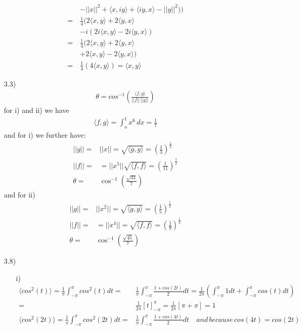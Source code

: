 \documentclass[letterpaper,12pt]{article}
\theoremstyle{definition}
\begin{document}
\begin{enumerate}
\begin{align*}
\quad & - ||x||^2 +\langle x, iy \rangle +\langle  iy ,x\rangle -||y||^2 ))
\\
=& \frac{1}{4}( 2 \langle x, y \rangle + 2\langle y, x \rangle \\
\quad &-i(2i\langle x, y \rangle  - 2i\langle y,x \rangle ) \\
=& \frac{1}{4}(2 \langle x, y \rangle + 2\langle y, x \rangle \\
\quad & + 2\langle x, y \rangle  - 2\langle y,x \rangle) \\
=& \frac{1}{4}(4\langle x, y \rangle) = \langle x, y \rangle
\end{align*}
\item[3.3)] \begin{eqnarray*}\theta = cos^{-1} \left( \frac{\langle f, g \rangle}{||f|| \, ||g||} \right) \end{eqnarray*}
for i) and ii) we have \begin{eqnarray*}
\langle f, g \rangle = \int_o^1 x^6 \, dx = \frac{1}{7}\end{eqnarray*}
and for i) we further have:
\begin{align*}
||g|| =&  ||x||= \sqrt{\langle g, g \rangle} = \left( \frac{1}{3} \right)^\frac{1}{2}\\
||f|| =&= ||x^5||  \sqrt{\langle f, f \rangle} =\left( \frac{1}{11} \right)^\frac{1}{2}\\
\theta =& \cos^{-1}\left( \frac{\sqrt{33}}{7} \right)
\end{align*}
and for ii)
\begin{align*}
||g|| =&  ||x^2||= \sqrt{\langle g, g \rangle} = \left( \frac{1}{5} \right)^\frac{1}{2}\\
||f|| =& =||x^4||= \sqrt{\langle f, f \rangle} =\left( \frac{1}{9} \right)^\frac{1}{2}\\
\theta =& \cos^{-1}\left( \frac{\sqrt{45}}{7} \right)
\end{align*}
\item[3.8)]
\begin{itemize}
\item[i)]\begin{align*}
\langle cos^2(t) \rangle = \frac{1}{\pi} \int_{-\pi}^{\pi} cos^2(t)dt =& \frac{1}{\pi} \int_{-\pi}^{\pi} \frac{1+cos(2t)}{2} dt = \frac{1}{2\pi} \left( \int_{-\pi}^{\pi}1dt + \int_{-\pi}^{\pi} cos(t)dt \right)\\
=& \frac{1}{2\pi} \left[ t \right]_{-\pi}^{\pi} = \frac{1}{2\pi} [\pi + \pi] = 1 \\
\langle cos^2(2t) \rangle = \frac{1}{\pi} \int_{-\pi}^{\pi} cos^2(2t)dt =& \frac{1}{\pi} \int_{-\pi}^{\pi} \frac{1+cos(4t)}{2} dt  \quad and \, because \, cos(4t)=cos(2t)\\

\end{align*}
\end{itemize}
\end{enumerate}
\end{document}
